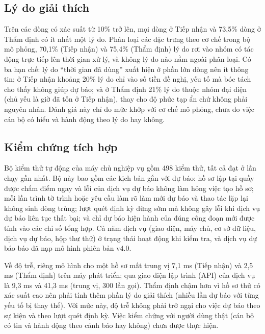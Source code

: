 \documentclass[journal]{IEEEtran}
\begin{document}
\subsection{Lý do giải thích}
Trên các dòng có xác suất từ 10\% trở lên, mọi dòng ở Tiếp nhận và 73,5\% dòng ở Thẩm định có ít nhất một lý do. Phân loại các đặc trưng theo cơ chế trong bộ mô phỏng, 70,1\% (Tiếp nhận) và 75,4\% (Thẩm định) lý do rơi vào nhóm có tác động trực tiếp lên thời gian xử lý, và không lý do nào nằm ngoài phân loại. Có ba hạn chế: lý do ``thời gian đã dùng'' xuất hiện ở phần lớn dòng nên ít thông tin; ở Tiếp nhận khoảng 20\% lý do chỉ vào số tiền đề nghị, yếu tố mà bóc tách cho thấy không giúp dự báo; và ở Thẩm định 21\% lý do thuộc nhóm đại diện (chủ yếu là giờ đã tốn ở Tiếp nhận), thay cho độ phức tạp ẩn chứ không phải nguyên nhân. Đánh giá này chỉ đo mức khớp với cơ chế mô phỏng, chưa đo việc cán bộ có hiểu và hành động theo lý do hay không.

\subsection{Kiểm chứng tích hợp}
Bộ kiểm thử tự động của máy chủ nghiệp vụ gồm 498 kiểm thử, tất cả đạt ở lần chạy gần nhất. Bộ này bao gồm các kịch bản gắn với dự báo: hồ sơ lập tại quầy được chấm điểm ngay và lỗi của dịch vụ dự báo không làm hỏng việc tạo hồ sơ; mỗi lần trình tờ trình hoặc yêu cầu làm rõ làm mới dự báo và thao tác lặp lại không sinh dòng trùng; lượt quét định kỳ dừng sớm mà không gây lỗi khi dịch vụ dự báo liên tục thất bại; và chỉ dự báo hiện hành của đúng công đoạn mới được tính vào các chỉ số tổng hợp. Cả năm dịch vụ (giao diện, máy chủ, cơ sở dữ liệu, dịch vụ dự báo, hộp thư thử) ở trạng thái hoạt động khi kiểm tra, và dịch vụ dự báo báo đã nạp mô hình phiên bản v4.0.

Về độ trễ, riêng mô hình cho một hồ sơ mất trung vị 7,1 ms (Tiếp nhận) và 2,5 ms (Thẩm định) trên máy phát triển; qua giao diện lập trình (API) của dịch vụ là 9,3 ms và 41,3 ms (trung vị, 300 lần gọi). Thẩm định chậm hơn vì hồ sơ thử có xác suất cao nên phải tính thêm phần lý do giải thích (nhiều lần dự báo với từng yếu tố bị thay thế). Với mức này, độ trễ không phải trở ngại cho việc dự báo theo sự kiện và theo lượt quét định kỳ. Việc kiểm chứng với người dùng thật (cán bộ có tin và hành động theo cảnh báo hay không) chưa được thực hiện.

\end{document}
